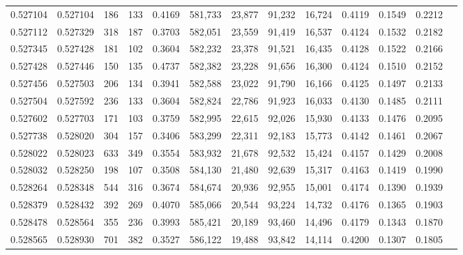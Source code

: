 \begin{tabular}{rrrrrrrrrrrrr}
0.527104 & 0.527104 &   186 &   133 &                                     0.4169 & 581,733 &  23,877 &  91,232 &  16,724 & 0.4119 & 0.1549 & 0.2212 \\
0.527112 & 0.527329 &   318 &   187 &                                     0.3703 & 582,051 &  23,559 &  91,419 &  16,537 & 0.4124 & 0.1532 & 0.2182 \\
0.527345 & 0.527428 &   181 &   102 &                                     0.3604 & 582,232 &  23,378 &  91,521 &  16,435 & 0.4128 & 0.1522 & 0.2166 \\
0.527428 & 0.527446 &   150 &   135 &                                     0.4737 & 582,382 &  23,228 &  91,656 &  16,300 & 0.4124 & 0.1510 & 0.2152 \\
0.527456 & 0.527503 &   206 &   134 &                                     0.3941 & 582,588 &  23,022 &  91,790 &  16,166 & 0.4125 & 0.1497 & 0.2133 \\
0.527504 & 0.527592 &   236 &   133 &                                     0.3604 & 582,824 &  22,786 &  91,923 &  16,033 & 0.4130 & 0.1485 & 0.2111 \\
0.527602 & 0.527703 &   171 &   103 &                                     0.3759 & 582,995 &  22,615 &  92,026 &  15,930 & 0.4133 & 0.1476 & 0.2095 \\
0.527738 & 0.528020 &   304 &   157 &                                     0.3406 & 583,299 &  22,311 &  92,183 &  15,773 & 0.4142 & 0.1461 & 0.2067 \\
0.528022 & 0.528023 &   633 &   349 &                                     0.3554 & 583,932 &  21,678 &  92,532 &  15,424 & 0.4157 & 0.1429 & 0.2008 \\
0.528032 & 0.528250 &   198 &   107 &                                     0.3508 & 584,130 &  21,480 &  92,639 &  15,317 & 0.4163 & 0.1419 & 0.1990 \\
0.528264 & 0.528348 &   544 &   316 &                                     0.3674 & 584,674 &  20,936 &  92,955 &  15,001 & 0.4174 & 0.1390 & 0.1939 \\
0.528379 & 0.528432 &   392 &   269 &                                     0.4070 & 585,066 &  20,544 &  93,224 &  14,732 & 0.4176 & 0.1365 & 0.1903 \\
0.528478 & 0.528564 &   355 &   236 &                                     0.3993 & 585,421 &  20,189 &  93,460 &  14,496 & 0.4179 & 0.1343 & 0.1870 \\
0.528565 & 0.528930 &   701 &   382 &                                     0.3527 & 586,122 &  19,488 &  93,842 &  14,114 & 0.4200 & 0.1307 & 0.1805 \\

\end{tabular}
